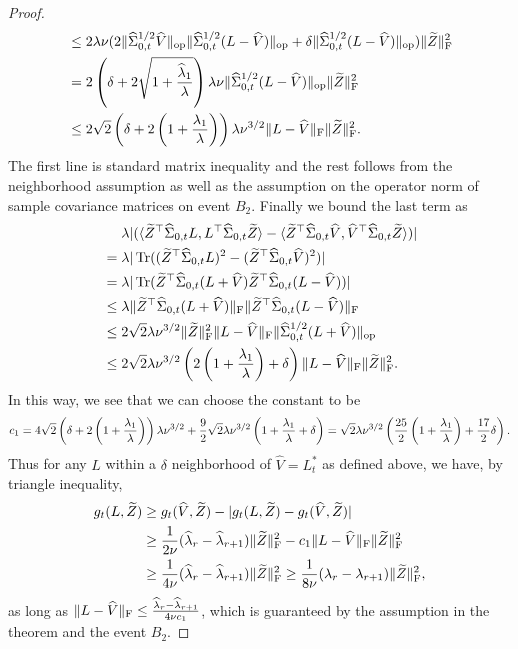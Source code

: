 \documentclass[11pt]{article}
\newcommand{\nb}[1]{\textcolor{orange}{\texttt{[#1]}}}
\newcommand{\rev}[1]{\textcolor{black}{#1}}
\newcommand{\hU}{\widehat{V}}
\newcommand{\sot}{\widehat{\Sigma}_{0,t}}
\DeclareMathOperator{\Tr}{Tr}
\newcommand{\0}{{\mathbf{0}}}
\newcommand{\op}{{\mathrm{op}}}
\newcommand{\tZ}{{\widetilde{Z}}}
\begin{document}
\begin{proof}
\begin{align*}
    &\leq 2\lambda\rev{\nu}(2\|\sot^{1/2}\hU\|_\op\|\sot^{1/2}(L-\hU)\|_\op+\delta \|\sot^{1/2}(L-\hU)\|_\op
      )\|\tZ\|_\mathrm{F}^2\\
    &= 2\left(\delta+2\sqrt{1+\frac{\widehat{\lambda}_1}{\lambda}}\right)\lambda\rev{\nu}\|\sot^{1/2}(L-\hU)\|_\op\|\tZ\|_\mathrm{F}^2\\
    &\leq 2\sqrt{2}\left(\delta+2\left(1+\frac{\lambda_1}{\lambda}\right)\right)\lambda\rev{\nu}^{3/2}\|L-\hU\|_\mathrm{F}\|\tZ\|_\mathrm{F}^2.
\end{align*}
The first line is standard matrix inequality and the rest follows  from the neighborhood assumption as well as the assumption on the operator norm of sample covariance matrices on event $B_2$. 
Finally we bound the last term as
\begin{align*}
& ~~~~\lambda |(\langle \tZ^\top \sot L, L^\top\sot \tZ\rangle-\langle \tZ^\top \sot \hU, \hU^\top\sot \tZ\rangle)| \\
&=\lambda |\Tr((\tZ^\top\sot L)^2-(\tZ^\top\sot\hU)^2)|\\
&= \lambda |\Tr(\tZ^\top\sot(L+\hU)\tZ^\top\sot (L-\hU))|\\
&\leq \lambda \|\tZ^\top\sot(L+\hU)\|_\mathrm{F}\|\tZ^\top\sot(L-\hU)\|_\mathrm{F}\\
&\leq 2\sqrt{2}\lambda\rev{\nu}^{3/2}\|\tZ\|_\mathrm{F}^2\|L-\hU\|_\mathrm{F} \|\sot^{1/2}(L+\hU)\|_\op\\
&\leq 2\sqrt{2}\lambda\rev{\nu}^{3/2}\left(2\left(1+\frac{\lambda_1}{\lambda}\right)+\delta\right)\|L-\hU\|_\mathrm{F}\|\tZ\|_\mathrm{F}^2.
\end{align*}
In this way, we see that we can choose the constant to be\begin{equation*}
    c_1=4\sqrt{2}\left(\delta+2\left(1+\frac{\lambda_1}{\lambda}\right)\right)\lambda\rev{\nu}^{3/2}+\frac{9}{2}\sqrt{2}\lambda\rev{\nu}^{3/2}\left(1+\frac{\lambda_1}{\lambda}+\delta\right)=\sqrt{2}\lambda\rev{\nu}^{3/2}\left(\frac{25}{2}\left(1+\frac{\lambda_1}{\lambda}\right)+\frac{17}{2}\delta\right).
\end{equation*} Thus for any $L$ within a $\delta$ neighborhood of $\hU=L^*_t$ as defined above, we have, by triangle inequality, \begin{align*}
    g_t(L,\tZ)&\geq g_t(\hU,\tZ)-|g_t(L,\tZ)-g_t(\hU,\tZ)|\\
    &\geq \frac{1}{2\rev{\nu}}(\widehat{\lambda}_r -\widehat{\lambda}_{r+1})\|\tZ\|_\mathrm{F}^2-c_1 \|L-\hU\|_\mathrm{F}\|\tZ\|_\mathrm{F}^2\\
    &\geq \frac{1}{4\rev{\nu}}(\widehat{\lambda}_r -\widehat{\lambda}_{r+1})\|\tZ\|_\mathrm{F}^2\geq \frac{1}{8\rev{\nu}}(\lambda_r-\lambda_{r+1})\|\tZ\|_\mathrm{F}^2,
\end{align*}
as long as $\|L-\hU\|_\mathrm{F}\leq \frac{\widehat{\lambda}_r -\widehat{\lambda}_{r+1}}{4\rev{\nu}c_1}$, which is guaranteed by the assumption in the theorem and the event $B_2$. 


\end{proof}
\end{document}
